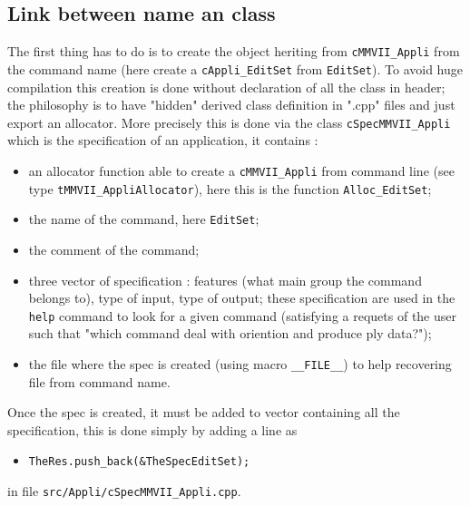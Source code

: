 
\subsection{Link between name an class}

The first thing \PPP has to do is to create the object heriting
from {\tt cMMVII\_Appli} from the command name (here create a {\tt cAppli\_EditSet}
from  {\tt EditSet}). To avoid huge compilation this creation is done
without declaration of all the class in header; the philosophy is to have
"hidden"  derived class definition in ".cpp" files  and just export an allocator.
More precisely this is done via the class {\tt cSpecMMVII\_Appli} which is
the specification of an application, it contains :

\begin{itemize}
   \item an allocator function able to create a {\tt cMMVII\_Appli} from command line
         (see type {\tt tMMVII\_AppliAllocator}), here this is the function {\tt Alloc\_EditSet};

   \item the name of the command, here {\tt EditSet};

   \item the comment of the command;

   \item three vector of specification : features (what main group the command belongs to), type
         of input, type of output;  these specification are used in the {\tt help} command to 
         look for a given command (satisfying a requets of the user such that "which command deal with oriention
         and produce ply data?");

   \item the file where the spec is created (using macro {\tt \_\_FILE\_\_}) to help recovering file from 
         command name.
\end{itemize}

Once the spec is created, it must be added to vector containing all the 
specification, this is done simply by adding a line as 
\begin{itemize}
   \item {\tt  TheRes.push\_back(\&TheSpecEditSet);} 
\end{itemize}

in file {\tt src/Appli/cSpecMMVII\_Appli.cpp}.



